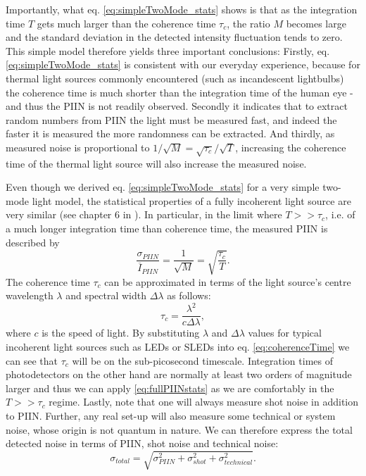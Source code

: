 \documentclass[]{article}
\newcommand*\mean[1]{\overline{#1}}
\begin{document}
	Importantly, what eq. \ref{eq:simpleTwoMode_stats} shows is that as the integration time $T$ gets much larger than the coherence time $\tau_c$, the ratio $M$ becomes large and the standard deviation in the detected intensity fluctuation tends to zero. This simple model therefore yields three important conclusions: Firstly, eq. \ref{eq:simpleTwoMode_stats} is consistent with our everyday experience, because for thermal light sources commonly encountered (such as incandescent lightbulbs) the coherence time is much shorter than the integration time of the human eye - and thus the PIIN is not readily observed. Secondly it indicates that to extract random numbers from PIIN the light must be measured fast, and indeed the faster it is measured the more randomness can be extracted. And thirdly, as measured noise is proportional to $1/\sqrt{M} = \sqrt{\tau_c}/\sqrt{T}$, increasing the coherence time of the thermal light source will also increase the measured noise.
	
	Even though we derived  eq. \ref{eq:simpleTwoMode_stats} for a very simple two-mode light model, the statistical properties of a fully incoherent light source are very similar (see chapter 6 in \cite{goodman_statistical_2000}). In particular, in the limit where $T>>\tau_c$, i.e. of a much longer integration time than coherence time, the measured PIIN is described by
		\begin{equation} 
		\frac{\sigma_{PIIN}}{\mean{I}_{PIIN}} = \frac{1}{\sqrt{M}} = \sqrt{\frac{\tau_c}{T}}.
		\label{eq:fullPIINstats}
		\end{equation}
	The coherence time $\tau_c$ can be approximated in terms of the light source's centre wavelength $\lambda$ and spectral width $\Delta\lambda$ as follows:
		\begin{equation}
		\tau_c = \frac{\lambda^2}{c\Delta\lambda},
		\label{eq:coherenceTime}
		\end{equation}
	where $c$ is the speed of light. By substituting $\lambda$ and $\Delta\lambda$ values for typical incoherent light sources such as LEDs or SLEDs into eq. \ref{eq:coherenceTime} we can see that $\tau_c$ will be on the sub-picosecond timescale. Integration times of photodetectors on the other hand are normally at least two orders of magnitude larger and thus we can apply \ref{eq:fullPIINstats} as we are comfortably in the $T>>\tau_c$ regime. Lastly, note that one will always measure shot noise in addition to PIIN. Further, any real set-up will also measure some technical or system noise, whose origin is not quantum in nature. We can therefore express the total detected noise in terms of PIIN, shot noise and technical noise:
		\begin{equation}
		\sigma_{total} = \sqrt{\sigma_{PIIN}^2 + \sigma_{shot}^2 + \sigma_{technical}^2}.
		\label{eq:noiseContributions}
		\end{equation}
\end{document}
